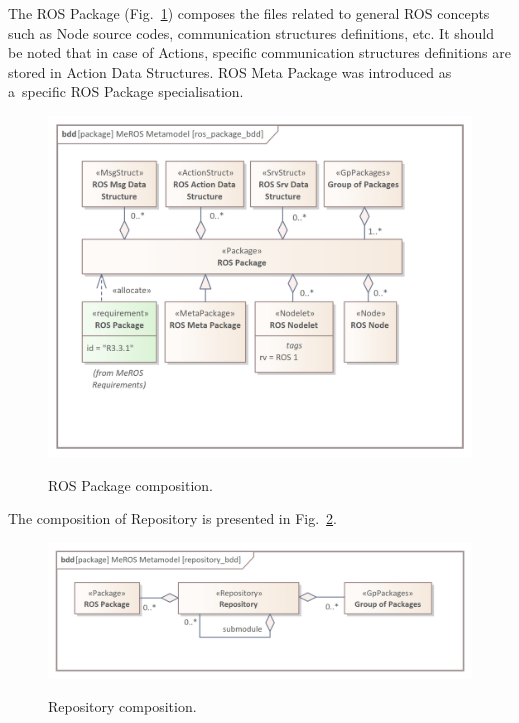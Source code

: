 \documentclass[11pt,oneside,a4paper]{report}
\begin{document}
	The ROS Package (Fig.~\ref{fig:ros_package_bdd}) composes the files related to general ROS concepts such as Node source codes, communication structures definitions, etc. It should be noted that in case of Actions, specific communication structures definitions are stored in Action Data Structures. ROS Meta Package was introduced as a~specific ROS Package specialisation.
	
	\begin{figure}[H]
		\centering
		\begin{center}
			{\includegraphics[scale=1.0]{img/meros_pkg/ros_package_bdd.png}}
		\end{center}
		\caption{ROS Package composition.} 
		\label{fig:ros_package_bdd}
	\end{figure}
		
		
%
	
The composition of Repository is presented in Fig.~\ref{fig:repository_bdd}.	
	
	\begin{figure}[H]
		\centering
		\begin{center}
			{\includegraphics[scale=1.0]{img/meros_pkg/repository_bdd.png}}
		\end{center}
		\caption{Repository composition.} 
		\label{fig:repository_bdd}
	\end{figure}
\end{document}
